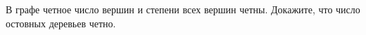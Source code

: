 В графе четное число вершин и степени всех вершин четны. Докажите, что число остовных деревьев четно.
